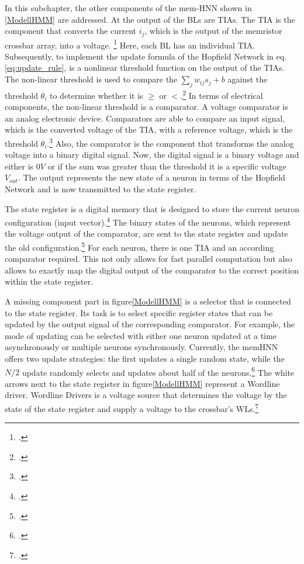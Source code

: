 In this subchapter, the other components of the \ac{mem-HNN} shown in \ref{ModellHMM} are addressed.
At the output of the BLs are \ac{TIA}s.
The \ac{TIA} is the component that converts the current \(i_j\), which is the output of the memristor crossbar array, into a voltage. \footcite[cf.][3]{hizzaniMemristorbasedHardwareAlgorithms2023}
Here, each BL has an individual \ac{TIA}.
Subsequently, to implement the update formula of the Hopfield Network in eq.\eqref{eq:update_rule}, is a nonlinear threshold function on the output of the \ac{TIA}s.
The non-linear threshold is used to compare the \(\sum_j w_{ij} s_j + b\) against the threshold \(\theta_i\) to determine whether it is \(\geq\) or \(<\).\footcite[cf.][18]{caiHarnessingIntrinsicNoise2019}
In terms of electrical components, the non-linear threshold is a comparator. 
A voltage comparator is an analog electronic device.
Comparators are able to compare an input signal, which is the converted voltage of the \ac{TIA}, with a reference voltage, which is the threshold \(\theta_i\).\footcite[cf.][28]{chenApplicationVoltageComparator2021}
Also, the comparator is the component that transforms the analog voltage into a binary digital signal.
Now, the digital signal is a binary voltage and either is \(0V\) or if the sum was greater than the threshold it is a specific voltage \(V_{out}\).
The output represents the new state of a neuron in terms of the Hopfield Network and is now transmitted to the state register.

The state register is a digital memory that is designed to store the current neuron configuration (input vector).\footcite[cf.][18]{caiHarnessingIntrinsicNoise2019}
The binary states of the neurons, which represent the voltage output of the comparator, are sent to the state register and update the old configuration.\footcite[cf.][3]{caiHarnessingIntrinsicNoise2019}
For each neuron, there is one \ac{TIA} and an according comparator required. 
This not only allows for fast parallel computation but also allows to exactly map the digital output of the comparator to the correct position within the state register.

A missing component part in figure\ref{ModellHMM} is a selector that is connected to the state register. 
Its task is to select specific register states that can be updated by the output signal of the corresponding comparator.  
For example, the mode of updating can be selected with either one neuron updated at a time asynchronously or multiple neurons synchronously. 
Currently, the memHNN offers two update strategies: the first updates a single random state, while the \(N/2\) update randomly selects and updates about half of the neurons.\footcite[cf.][3]{hizzaniMemristorbasedHardwareAlgorithms2023}
The white arrows next to the state register in figure\ref{ModellHMM} represent a Wordline driver. 
Wordline Drivers is a voltage source that determines the voltage by the state of the state register and supply a voltage to the crossbar's WLs.\footcite[cf.][18]{caiHarnessingIntrinsicNoise2019}

